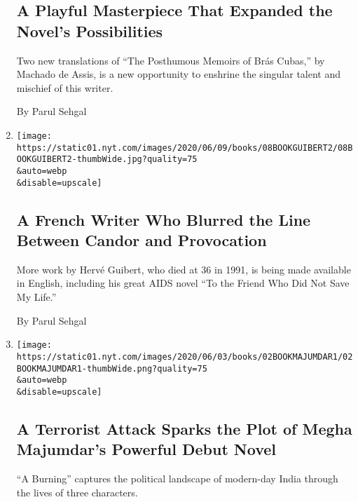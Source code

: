 \begin{enumerate}
{  \subsection{A Playful Masterpiece That Expanded the Novel's
  Possibilities}\label{a-playful-masterpiece-that-expanded-the-novels-possibilities}}

  Two new translations of ``The Posthumous Memoirs of Brás Cubas,'' by
  Machado de Assis, is a new opportunity to enshrine the singular talent
  and mischief of this writer.

  By Parul Sehgal
\item
  \href{/2020/06/08/books/review-herve-guibert-to-friend-who-did-not-save-my-life-written-in-invisible-ink.html}{}

  \texttt{[image: https://static01.nyt.com/images/2020/06/09/books/08BOOKGUIBERT2/08BOOKGUIBERT2-thumbWide.jpg?quality=75\\\&auto=webp\\\&disable=upscale]}

  \hypertarget{a-french-writer-who-blurred-the-line-between-candor-and-provocation}{%
  \subsection{A French Writer Who Blurred the Line Between Candor and
  Provocation}\label{a-french-writer-who-blurred-the-line-between-candor-and-provocation}}

  More work by Hervé Guibert, who died at 36 in 1991, is being made
  available in English, including his great AIDS novel ``To the Friend
  Who Did Not Save My Life.''

  By Parul Sehgal
\item
  \href{/2020/06/02/books/review-burning-megha-majumdar.html}{}

  \texttt{[image: https://static01.nyt.com/images/2020/06/03/books/02BOOKMAJUMDAR1/02BOOKMAJUMDAR1-thumbWide.png?quality=75\\\&auto=webp\\\&disable=upscale]}

  \hypertarget{a-terrorist-attack-sparks-the-plot-of-megha-majumdars-powerful-debut-novel}{%
  \subsection{A Terrorist Attack Sparks the Plot of Megha Majumdar's
  Powerful Debut
  Novel}\label{a-terrorist-attack-sparks-the-plot-of-megha-majumdars-powerful-debut-novel}}

  ``A Burning'' captures the political landscape of modern-day India
  through the lives of three characters.


\end{enumerate}
